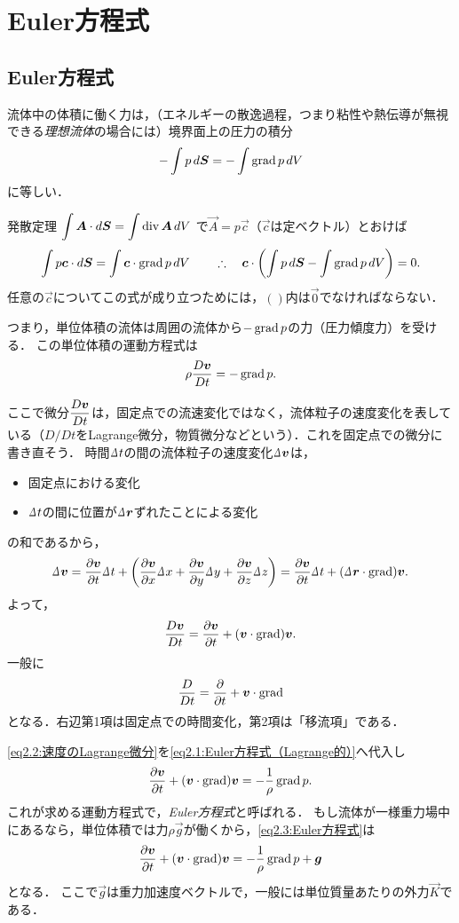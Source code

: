 \section{Euler方程式}\label{sec:2}
\subsection*{Euler方程式}
流体中の体積に働く力は，（エネルギーの散逸過程，つまり粘性や熱伝導が無視できる\emph{理想流体}の場合には）境界面上の圧力の積分
\[
    - \int p \,d\vb*{S} = - \int \operatorname{grad} p \, dV
\]
に等しい．
\begin{details}
\nazenara
発散定理
$\displaystyle \int\vb*{A}\cdot d\vb*{S} = \int\operatorname{div}\vb*{A} \, dV$
で$\vec{A}=p\vec{c}$（$\vec{c}$は定ベクトル）とおけば
\[
    \int p\vec{c}\cdot\dS = \int \vec{c} \cdot \Grad p \dV
    \qquad\yueni \vec{c}\cdot\pqty{ \int p\,\dS - \int\Grad p \dV } = 0 .
\]
任意の$\vec{c}$についてこの式が成り立つためには，$()$内は$\vec{0}$でなければならない．
\end{details}
\noindent
つまり，単位体積の流体は周囲の流体から$-\operatorname{grad} p$の力（圧力傾度力）を受ける．
この単位体積の運動方程式は
\begin{equation}\label{eq2.1:Euler方程式（Lagrange的）}
    \rho\frac{D \vb*{v}}{D t} = -\operatorname{grad} p .
\end{equation}

ここで微分$\dfrac{D \vb*{v}}{D t}$は，固定点での流速変化ではなく，流体粒子の速度変化を表している（$D/Dt$をLagrange微分，物質微分などという）．これを固定点での微分に書き直そう．
時間$\D t$の間の流体粒子の速度変化$\D\v$は，
\begin{itemize}
    \item 固定点における変化
    \item $\D t$の間に位置が$\D \vec{r}$ずれたことによる変化
\end{itemize}
の和であるから，
\[
    \D\v = \pdv{\v}{t} \D t + \pqty{ \pdv{\v}{x} \D x + \pdv{\v}{y} \D y + \pdv{\v}{z} \D z } = \pdv{\v}{t} \D t + (\D\vec{r}\cdot\Grad)\v.
\]
よって，
\begin{equation}\label{eq2.2:速度のLagrange微分}
    \frac{D \vb*{v}}{D t} = \pdv{\vb*{v}}{t} + (\vb*{v}\cdot\operatorname{grad})\vb*{v}.
\end{equation}
一般に
\[
    \frac{D }{D t} = \pdv{t} + \vb*{v}\cdot\operatorname{grad}
\]
となる．右辺第1項は固定点での時間変化，第2項は「移流項」である．

\eqref{eq2.2:速度のLagrange微分}を\eqref{eq2.1:Euler方程式（Lagrange的）}へ代入し
\begin{equation}\label{eq2.3:Euler方程式}
    \pdv{\vb*{v}}{t} + (\vb*{v}\cdot\operatorname{grad})\vb*{v} = -\frac{1}{\rho} \operatorname{grad} p .
\end{equation}
これが求める運動方程式で，\emph{Euler方程式}と呼ばれる．
もし流体が一様重力場中にあるなら，単位体積では力$\rho\vec{g}$が働くから，\eqref{eq2.3:Euler方程式}は
\begin{equation}\label{eq2.4:一様重力場中のEuler方程式}
    \pdv{\vb*{v}}{t} + (\vb*{v}\cdot\operatorname{grad})\vb*{v} = -\frac{1}{\rho} \operatorname{grad} p + \vb*{g}
\end{equation}
となる．
ここで$\vec{g}$は重力加速度ベクトルで，一般には単位質量あたりの外力$\vec{K}$である．


